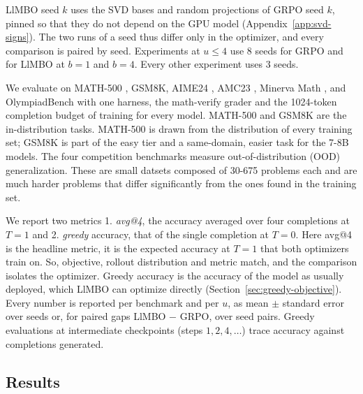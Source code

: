 \documentclass[twoside]{article}
\newcommand{\llmbo}{LlMBO}
\begin{document}
\llmbo{} seed $k$ uses the SVD bases and random projections of GRPO seed $k$, pinned so that they do not depend on the GPU model (Appendix~\ref{app:svd-signs}). The two runs of a seed thus differ only in the optimizer, and every comparison is paired by seed. Experiments at $u \le 4$ use 8 seeds for GRPO and for \llmbo{} at $b = 1$ and $b = 4$. Every other experiment uses 3 seeds.

We evaluate on MATH-500 \citep{lightman2024verify}, GSM8K, AIME24 \citep{aime24}, AMC23 \citep{amc23}, Minerva Math \citep{lewkowycz2022minerva}, and OlympiadBench \citep{he2024olympiadbench} with one harness, the math-verify grader and the 1024-token completion budget of training for every model. MATH-500 and GSM8K are the in-distribution tasks. MATH-500 is drawn from the distribution of every training set; GSM8K is part of the easy tier and a same-domain, easier task for the 7-8B models. The four competition benchmarks measure out-of-distribution (OOD) generalization. These are small datsets composed of 30-675 problems each and are much harder problems that differ significantly from the ones found in the training set.

We report two metrics 1. \emph{avg@4}, the accuracy averaged over four completions at $T = 1$ and 2. \emph{greedy} accuracy, that of the single completion at $T = 0$. Here avg@4 is the headline metric, it is the expected accuracy at $T=1$ that both optimizers train on. So, objective, rollout distribution and metric match, and the comparison isolates the optimizer. Greedy accuracy is the accuracy of the model as usually deployed, which \llmbo{} can optimize directly (Section~\ref{sec:greedy-objective}). Every number is reported per benchmark and per $u$, as mean $\pm$ standard error over seeds or, for paired gaps {\llmbo{} $-$ GRPO}, over seed pairs. Greedy evaluations at intermediate checkpoints (steps $1, 2, 4, \dots$) trace accuracy against completions generated.

\subsection{Results}
\label{sec:results}
\label{sec:pooled}
\end{document}
